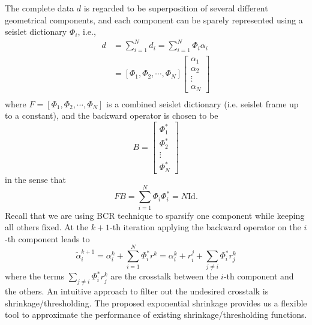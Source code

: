 \label{app:seisletframe}

The complete data $d$ is regarded to be superposition of several different geometrical components, and each component can be sparely represented using a seislet dictionary $\Phi_i$, i.e.,
\begin{equation}
\begin{array}{ll}
  d&=\sum_{i=1}^N d_i=\sum_{i=1}^N \Phi_i \alpha_i\\
  &=[\Phi_1,\Phi_2,\cdots,\Phi_N]\left[\begin{array}{l}
                                        \alpha_1\\
                                        \alpha_2\\
                                        \vdots\\
                                        \alpha_N
                                       \end{array}
\right]\\
\end{array}
\end{equation}
where $F=[\Phi_1,\Phi_2,\cdots,\Phi_N]$ is a combined seislet dictionary (i.e. seislet frame up to a constant), and the backward operator is chosen to be
\begin{equation}
 B=\left[\begin{array}{l}
                \Phi_1^{*}\\
		\Phi_2^{*}\\
                \vdots\\
                \Phi_N^{*}
   \end{array} \right]
\end{equation}
in the sense that
\begin{equation}
 FB=\sum_{i=1}^N\Phi_i\Phi_i^{*}=N \mathrm{Id}.
\end{equation}
Recall that we are using BCR technique to sparsify one component while keeping all others fixed. At the $k+1$-th iteration applying the backward operator on the $i$-th component leads to
\begin{equation}
\tilde{\alpha}_i^{k+1}=\alpha_i^k+\sum_{i=1}^N\Phi_i^{*} r^k=\alpha_i^k+r_i^j+\sum_{j\neq i}\Phi_i^{*} r_j^k
\end{equation}
where the terms $\sum_{j\neq i}\Phi_i^{*}r_j^k$ are the crosstalk between the $i$-th component and the others. An intuitive approach to filter out the undesired crosstalk is shrinkage/thresholding. The proposed exponential shrinkage provides us a flexible tool to approximate the performance of existing shrinkage/thresholding functions.




